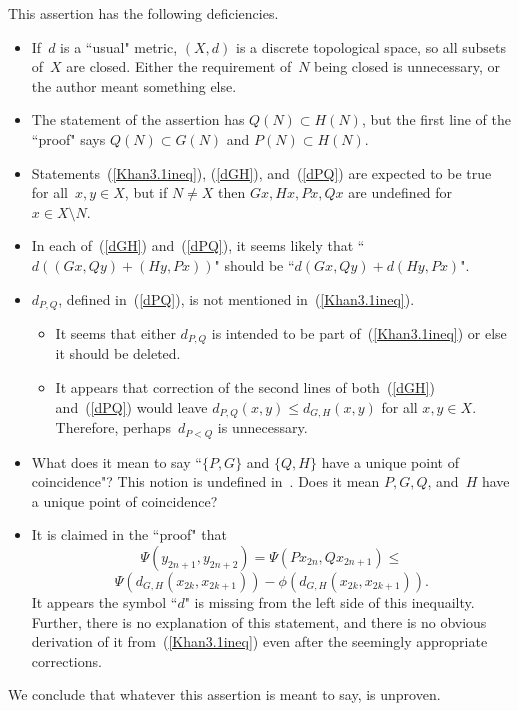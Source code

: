 \documentclass{article}
\numberwithin{thm}{section}
\begin{document}
This assertion
has the following deficiencies.
\begin{itemize}
\item If~$d$ is a
``usual" metric, $(X,d)$ is a discrete topological space, so all subsets of~$X$ are closed.
Either the requirement of~$N$
being closed is
unnecessary, or the
author meant something else.
\item The statement of
    the assertion has
    $Q(N) \subset H(N)$, but
    the first line of the ``proof" says $Q(N) \subset G(N)$ and
    $P(N) \subset H(N)$.
    \item Statements~(\ref{Khan3.1ineq}), (\ref{dGH}),
    and~(\ref{dPQ}) are
    expected to be true for all~$x,y \in X$,
    but if $N \neq X$ then $Gx,Hx,Px,Qx$
    are undefined for~$x \in X \setminus N$.
   \item In each of~(\ref{dGH}) and~(\ref{dPQ}),
    it seems likely that ``$d((Gx,Qy) + (Hy,Px))$"
    should be ``$d(Gx,Qy) + d(Hy,Px)$".
    \item $d_{P,Q}$, defined in~(\ref{dPQ}), is not
    mentioned in~(\ref{Khan3.1ineq}). 
    \begin{itemize} 
       \item It seems that either $d_{P,Q}$ is intended 
             to be part of~(\ref{Khan3.1ineq}) or else it 
             should be deleted.
       \item It appears that correction of the second lines
             of both~(\ref{dGH}) and~(\ref{dPQ}) would leave
             $d_{P,Q}(x,y) \le d_{G,H}(x,y)$ for all
             $x,y \in X$. Therefore, perhaps~$d_{P<Q}$
             is unnecessary.
    \end{itemize}    
    \item What does it mean
    to say ``$\{P, G\}$ and $\{Q, H\}$ have a unique point of
    coincidence"? This notion is undefined in~\cite{Khan}. 
    Does it mean $P,G,Q$, and~$H$ have a 
    unique point of coincidence?
    \item It is claimed in the
    ``proof" that
    \[ \Psi(y_{2n+1},y_{2n+2})=\Psi(Px_{2n},Qx_{2n+1}) \le
    \]
    \[ \Psi(d_{G,H}(x_{2k},x_{2k+1}))
    - \phi(d_{G,H}(x_{2k},x_{2k+1})).
    \]
    It appears the symbol ``$d$" is missing from the left
    side of this inequailty. Further, there is no explanation 
    of this statement, and there is no obvious derivation of 
    it from~(\ref{Khan3.1ineq}) even after the seemingly
    appropriate corrections.
\end{itemize}
We conclude that
whatever this assertion is meant to
say, is unproven.
\end{document}
